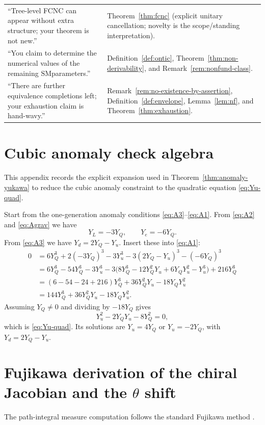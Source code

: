 \documentclass[11pt]{article}
\theoremstyle{remark}
\newcommand{\SM}{\ensuremath{\mathrm{SM}}}
\begin{document}
\begin{center}
\begin{tabular}{@{}p{}p{}@{}}
``Tree-level FCNC can appear without extra structure; your theorem is not new.'' &
Theorem~\ref{thm:fcnc} (explicit unitary cancellation; novelty is the scope/standing interpretation).\\
``You claim to determine the numerical values of the remaining \SM parameters.'' &
Definition~\ref{def:ontic}, Theorem~\ref{thm:non-derivability}, and Remark~\ref{rem:nonfund-class}.\\
``There are further equivalence completions left; your exhaustion claim is hand-wavy.'' &
Remark~\ref{rem:no-existence-by-assertion}, Definition~\ref{def:envelope}, Lemma~\ref{lem:nf}, and
Theorem~\ref{thm:exhaustion}.\\
\bottomrule
\end{tabular}
\end{center}


\appendix

\section{Cubic anomaly check algebra}\label{app:cubic-check}
This appendix records the explicit expansion used in Theorem~\ref{thm:anomaly-yukawa} to reduce the
cubic anomaly constraint to the quadratic equation \eqref{eq:Yu-quad}.

Start from the one-generation anomaly conditions \eqref{eq:A3}--\eqref{eq:A1}.
From \eqref{eq:A2} and \eqref{eq:Agrav} we have
\[
Y_L=-3Y_Q,\qquad Y_e=-6Y_Q.
\]
From \eqref{eq:A3} we have $Y_d=2Y_Q-Y_u$.
Insert these into \eqref{eq:A1}:
\begin{align}
0
&=6Y_Q^3+2(-3Y_Q)^3-3Y_u^3-3(2Y_Q-Y_u)^3-(-6Y_Q)^3\\
&=6Y_Q^3-54Y_Q^3-3Y_u^3-3\Big(8Y_Q^3-12Y_Q^2Y_u+6Y_QY_u^2-Y_u^3\Big)+216Y_Q^3\\
&=(6-54-24+216)Y_Q^3+36Y_Q^2Y_u-18Y_QY_u^2\\
&=144Y_Q^3+36Y_Q^2Y_u-18Y_QY_u^2.
\end{align}
Assuming $Y_Q\neq 0$ and dividing by $-18Y_Q$ gives
\[
Y_u^2-2Y_QY_u-8Y_Q^2=0,
\]
which is \eqref{eq:Yu-quad}. Its solutions are $Y_u=4Y_Q$ or $Y_u=-2Y_Q$, with $Y_d=2Y_Q-Y_u$.
\section{Fujikawa derivation of the chiral Jacobian and the $\theta$ shift}\label{app:fujikawa}
The path-integral measure computation follows the standard Fujikawa method \cite{Fujikawa1979,Fujikawa1980}.
\end{document}
